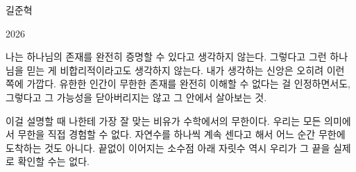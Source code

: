 \documentclass[11pt]{article}
\newcommand{\essaytitle}{보편적 신앙}
\newcommand{\essayauthor}{길준혁}
\newcommand{\essayyear}{2026}
\begin{document}
\begin{center}
  {\fontsize{22}{28}\selectfont\textls[40]{\essaytitle}}\par
  \vspace{1.4em}
  {\large\essayauthor}\par
  \vspace{0.35em}
  {\normalsize\essayyear}\par
\end{center}

\vspace{2.2em}

\noindent 나는 하나님의 존재를 완전히 증명할 수 있다고 생각하지 않는다.
그렇다고 그런 하나님을 믿는 게 비합리적이라고도 생각하지 않는다. 내가 생각하는
신앙은 오히려 이런 쪽에 가깝다. 유한한 인간이 무한한 존재를 완전히 이해할 수
없다는 걸 인정하면서도, 그렇다고 그 가능성을 닫아버리지는 않고 그 안에서
살아보는 것.

이걸 설명할 때 나한테 가장 잘 맞는 비유가 수학에서의 무한이다. 우리는 모든
의미에서 무한을 직접 경험할 수 없다. 자연수를 하나씩 계속 센다고 해서 어느
순간 무한에 도착하는 것도 아니다. 끝없이 이어지는 소수점 아래 자릿수 역시
우리가 그 끝을 실제로 확인할 수는 없다.
\end{document}
